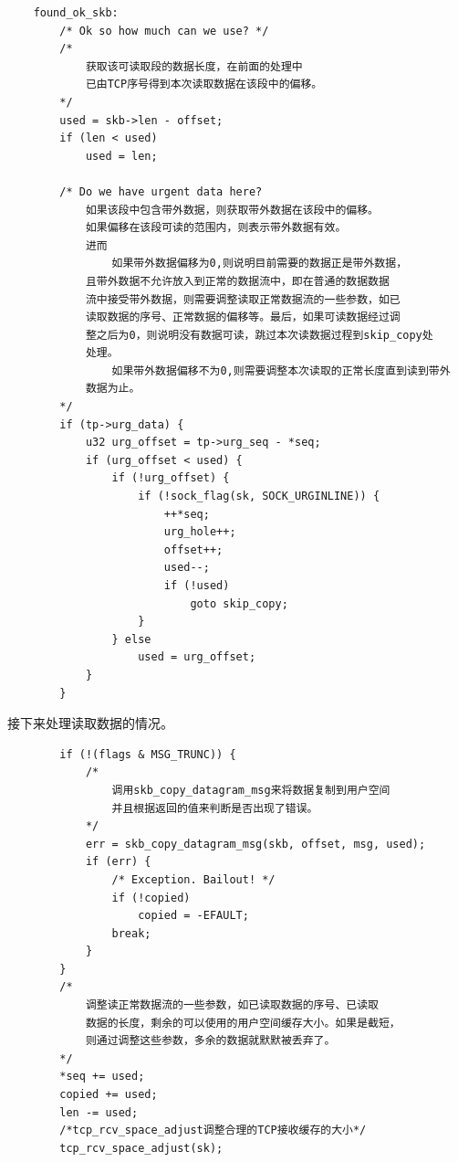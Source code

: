         
\begin{verbatim}
    found_ok_skb:
        /* Ok so how much can we use? */
        /*
            获取该可读取段的数据长度，在前面的处理中
            已由TCP序号得到本次读取数据在该段中的偏移。
        */
        used = skb->len - offset;
        if (len < used)
            used = len;

        /* Do we have urgent data here? 
            如果该段中包含带外数据，则获取带外数据在该段中的偏移。
            如果偏移在该段可读的范围内，则表示带外数据有效。
            进而
                如果带外数据偏移为0,则说明目前需要的数据正是带外数据，
            且带外数据不允许放入到正常的数据流中，即在普通的数据数据
            流中接受带外数据，则需要调整读取正常数据流的一些参数，如已
            读取数据的序号、正常数据的偏移等。最后，如果可读数据经过调
            整之后为0，则说明没有数据可读，跳过本次读数据过程到skip_copy处
            处理。
                如果带外数据偏移不为0,则需要调整本次读取的正常长度直到读到带外
            数据为止。
        */
        if (tp->urg_data) {
            u32 urg_offset = tp->urg_seq - *seq;
            if (urg_offset < used) {
                if (!urg_offset) {
                    if (!sock_flag(sk, SOCK_URGINLINE)) {
                        ++*seq;
                        urg_hole++;
                        offset++;
                        used--;
                        if (!used)
                            goto skip_copy;
                    }
                } else
                    used = urg_offset;
            }
        }
\end{verbatim}
    
    接下来处理读取数据的情况。
\begin{verbatim}
        if (!(flags & MSG_TRUNC)) {
            /*
                调用skb_copy_datagram_msg来将数据复制到用户空间
                并且根据返回的值来判断是否出现了错误。
            */          
            err = skb_copy_datagram_msg(skb, offset, msg, used);
            if (err) {
                /* Exception. Bailout! */
                if (!copied)
                    copied = -EFAULT;
                break;
            }
        }
        /*
            调整读正常数据流的一些参数，如已读取数据的序号、已读取
            数据的长度，剩余的可以使用的用户空间缓存大小。如果是截短，
            则通过调整这些参数，多余的数据就默默被丢弃了。
        */
        *seq += used;
        copied += used;
        len -= used;
        /*tcp_rcv_space_adjust调整合理的TCP接收缓存的大小*/
        tcp_rcv_space_adjust(sk);
\end{verbatim}

